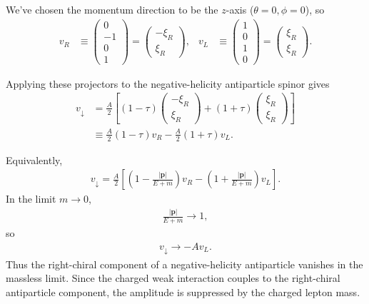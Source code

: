 We've chosen the momentum direction to be the \(z\)-axis
(\(\theta = 0, \phi = 0\)), so
\begin{align}
v_R
&\equiv
\begin{pmatrix}
0 \\
-1 \\
0 \\
1
\end{pmatrix}
=
\begin{pmatrix}
-\xi_R \\
\xi_R
\end{pmatrix},
&
v_L
&\equiv
\begin{pmatrix}
1 \\
0 \\
1 \\
0
\end{pmatrix}
=
\begin{pmatrix}
\xi_R \\
\xi_R
\end{pmatrix}.
\end{align}

Applying these projectors to the negative-helicity antiparticle spinor gives
\begin{align}
v_{\downarrow}
&=
\frac{A}{2}
\left[
(1-\tau)
\begin{pmatrix}
-\xi_R \\
\xi_R
\end{pmatrix}
+
(1+\tau)
\begin{pmatrix}
\xi_R \\
\xi_R
\end{pmatrix}
\right]
\\[0.5em]
&\equiv
\frac{A}{2}(1-\tau)v_R
-
\frac{A}{2}(1+\tau)v_L .
\end{align}

Equivalently,
\begin{align}
v_\downarrow
=
\frac{A}{2}
\left[
\left(1-\frac{|\mathbf{p}|}{E+m}\right)v_R
-
\left(1+\frac{|\mathbf{p}|}{E+m}\right)v_L
\right].
\end{align}
In the limit \(m\to 0\),
\begin{align}
\frac{|\mathbf{p}|}{E+m} \to 1,
\end{align}
so
\begin{align}
v_\downarrow \to -A v_L .
\end{align}
Thus the right-chiral component of a negative-helicity antiparticle vanishes in
the massless limit. Since the charged weak interaction couples to the
right-chiral antiparticle component, the amplitude is suppressed by the charged
lepton mass.

